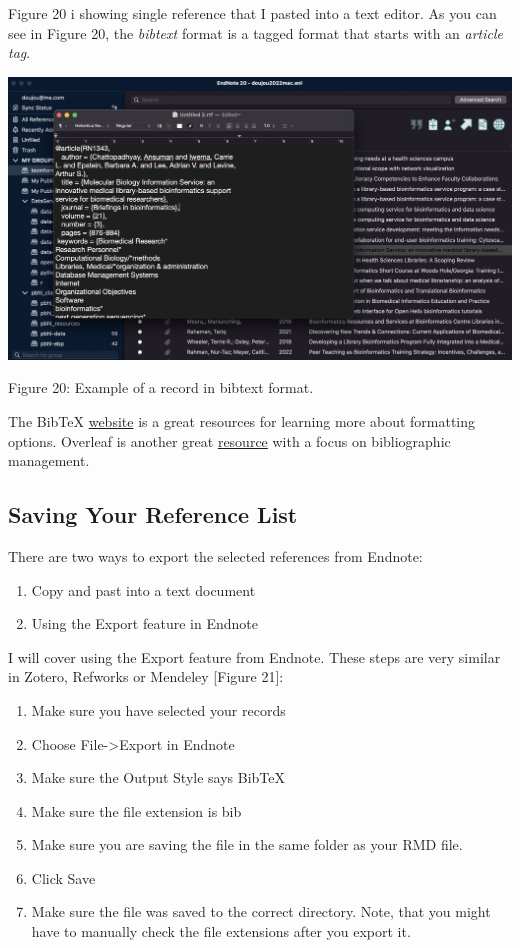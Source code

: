 \documentclass[
]{article}
\providecommand{\tightlist}{%
  \setlength{\itemsep}{0pt}\setlength{\parskip}{0pt}}
\begin{document}
Figure 20 i showing single reference that I pasted into a text editor.
As you can see in Figure 20, the \emph{bibtext} format is a tagged
format that starts with an \emph{article tag}.

\includegraphics[width=6.66667in,height=\textheight]{images/bib-04.png}

Figure 20: Example of a record in bibtext format.

The BibTeX \href{http://www.bibtex.org/Format/}{website} is a great
resources for learning more about formatting options. Overleaf is
another great
\href{Bibliography\%20management\%20with\%20bibtex}{resource} with a
focus on bibliographic management.

\hypertarget{saving-your-reference-list}{%
\subsection{Saving Your Reference
List}\label{saving-your-reference-list}}

There are two ways to export the selected references from Endnote:

\begin{enumerate}
\def\labelenumi{\arabic{enumi}.}
\tightlist
\item
  Copy and past into a text document
\item
  Using the Export feature in Endnote
\end{enumerate}

I will cover using the Export feature from Endnote. These steps are very
similar in Zotero, Refworks or Mendeley {[}Figure 21{]}:

\begin{enumerate}
\def\labelenumi{\arabic{enumi}.}
\tightlist
\item
  Make sure you have selected your records
\item
  Choose File-\textgreater Export in Endnote
\item
  Make sure the Output Style says BibTeX
\item
  Make sure the file extension is bib
\item
  Make sure you are saving the file in the same folder as your RMD file.
\item
  Click Save
\item
  Make sure the file was saved to the correct directory. Note, that you
  might have to manually check the file extensions after you export it.
\end{enumerate}
\end{document}
